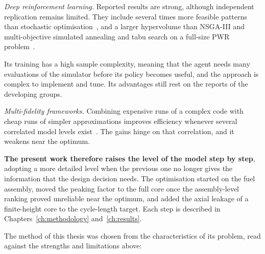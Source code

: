 \emph{Deep reinforcement learning.} Reported results are strong, although
independent replication remains limited. They
include several times more feasible patterns than stochastic
optimisation~\cite{radaideh_2021_rl}, and a larger hypervolume than
NSGA-III and multi-objective simulated annealing and tabu search on a
full-size PWR problem~\cite{seurin_2024_pearl}.

Its training has a high sample complexity, meaning that the agent needs
many evaluations of the simulator before its policy becomes useful, and
the approach is complex to implement and tune. Its advantages still rest on the reports of the developing groups.

\emph{Multi-fidelity frameworks.} Combining expensive runs of a complex
code with cheap runs of simpler approximations improves efficiency
whenever several correlated model levels
exist~\cite{kennedy_ohagan_2000}. The gains hinge on that correlation,
and it weakens near the optimum.

\textbf{The present work therefore raises the level of the model step by
step},
adopting a more detailed level when the previous one no longer gives the
information that the design decision needs. The optimisation started on
the fuel assembly, moved the peaking factor to the full core once the
assembly-level ranking proved unreliable near the optimum, and added the
axial leakage of a finite-height core to the cycle-length target. Each
step is described in Chapters~\ref{ch:methodology}
and~\ref{ch:results}.

The method of this thesis was chosen from the characteristics of its
problem, read against the strengths and limitations above:


